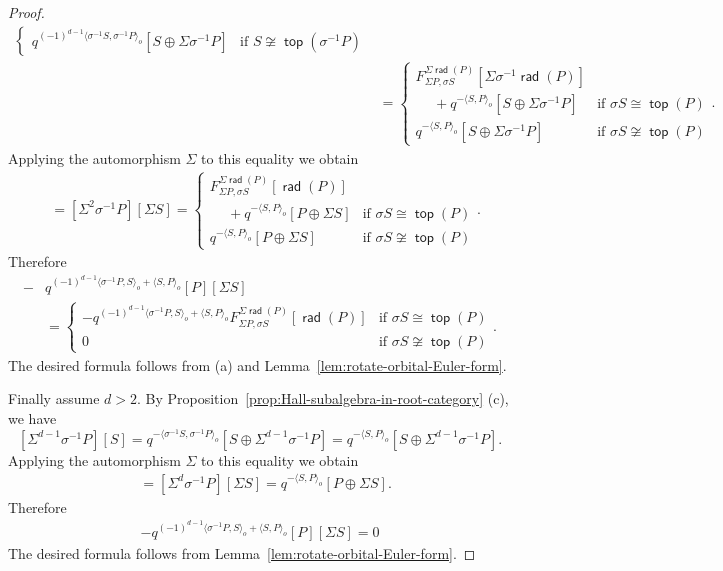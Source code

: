 \documentclass[reqno,12pt,a4paper]{amsart}
\theoremstyle{remark}
\theoremstyle{definition}
\newcommand{\opname}[1]{\operatorname{\mathsf{#1}}}
\newcommand{\rad}{\opname{rad}\nolimits}
\renewcommand{\top}{\opname{top}\nolimits}
\numberwithin{equation}{section}
\begin{document}
\begin{proof}
\begin{align*}
\begin{cases}
q^{(-1)^{d-1}\langle \sigma^{-1}S,\sigma^{-1}P\rangle_o}[S\oplus\Sigma \sigma^{-1}P] & \text{if }S\not\cong \top(\sigma^{-1}P)
\end{cases}\\
&=\begin{cases}
F_{\Sigma P,\sigma S}^{\Sigma\rad(P)}[\Sigma \sigma^{-1}\rad(P)]\\ \hspace{15pt}+q^{-\langle S,P\rangle_o}[S\oplus\Sigma \sigma^{-1}P] & \text{if }\sigma S\cong\top(P)\\
q^{-\langle S,P\rangle_o}[S\oplus\Sigma \sigma^{-1}P] & \text{if }\sigma S\not\cong \top(P)
\end{cases}.
\end{align*}
Applying the automorphism $\Sigma$ to this equality we obtain
\begin{align*}
[P][\Sigma S]&=[\Sigma^2\sigma^{-1}P][\Sigma S]=\begin{cases}
F_{\Sigma P,\sigma S}^{\Sigma\rad(P)}[\rad(P)]\\ \hspace{15pt}+q^{-\langle S,P\rangle_o}[P\oplus\Sigma S] & \text{if }\sigma S\cong\top(P)\\
q^{-\langle S,P\rangle_o}[P\oplus\Sigma S] & \text{if }\sigma S\not\cong \top(P)
\end{cases}.
\end{align*}
Therefore
\begin{align*}
[\Sigma S][P]-&q^{(-1)^{d-1}\langle \sigma^{-1}P,S\rangle_o+\langle S,P\rangle_o}[P][\Sigma S]\\
&=
\begin{cases} -q^{(-1)^{d-1}\langle \sigma^{-1}P,S\rangle_o+\langle S,P\rangle_o}F_{\Sigma P,\sigma S}^{\Sigma\rad(P)}[\rad(P)] &\text{if }\sigma S\cong \top(P)\\
0 & \text{if }\sigma S\not\cong\top(P)
\end{cases}.
\end{align*}
The desired formula follows from (a) and Lemma~\ref{lem:rotate-orbital-Euler-form}.

Finally assume $d>2$. By Proposition~\ref{prop:Hall-subalgebra-in-root-category} (c), we have
\[
[\Sigma^{d-1}\sigma^{-1}P][S]=q^{-\langle\sigma^{-1}S,\sigma^{-1}P\rangle_o}[S\oplus\Sigma^{d-1}\sigma^{-1}P]=q^{-\langle S,P\rangle_o}[S\oplus\Sigma^{d-1}\sigma^{-1}P].
\]
Applying the automorphism $\Sigma$ to this equality we obtain
\begin{align*}
[P][\Sigma S]&=[\Sigma^d\sigma^{-1}P][\Sigma S]=q^{-\langle S,P\rangle_o}[P\oplus\Sigma S].
\end{align*}
Therefore
\begin{align*}
[\Sigma S][P]-q^{(-1)^{d-1}\langle \sigma^{-1}P,S\rangle_o+\langle S,P\rangle_o}[P][\Sigma S]=0
\end{align*}
The desired formula follows from Lemma~\ref{lem:rotate-orbital-Euler-form}.


\end{proof}
\end{document}
